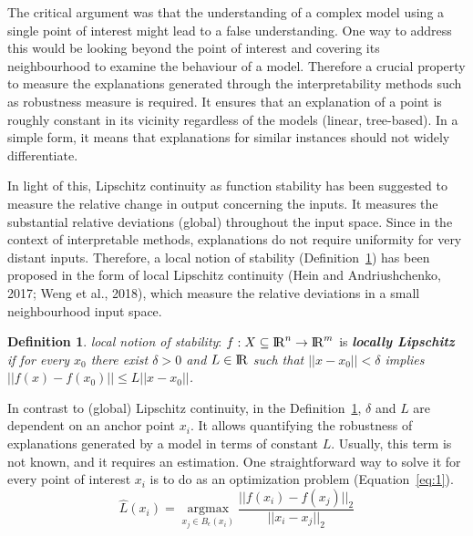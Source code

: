 \documentclass[english]{tktltiki2}
\theoremstyle{definition}
\newtheorem{definition}[thm]{Definition}
\theoremstyle{remark}
\begin{document}
The critical argument was that the understanding of a complex model using a single point of interest might lead to a false understanding. One way to address this would be looking beyond the point of interest and covering its neighbourhood to examine the behaviour of a model. Therefore a crucial property to measure the explanations generated through the interpretability methods such as robustness measure is required. It ensures that an explanation of a point is roughly constant in its vicinity regardless of the models (linear, tree-based).  In a simple form, it means that explanations for similar instances should not widely differentiate.

In light of this, Lipschitz continuity as function stability has been suggested to measure the relative change in output concerning the inputs. It measures the substantial relative deviations (global) throughout the input space. Since in the context of interpretable methods, explanations do not require uniformity for very distant inputs. Therefore, a local notion of stability (Definition~\ref{def:3}) has been proposed in the form of local Lipschitz continuity (Hein and Andriushchenko, 2017; Weng et al., 2018), which measure the relative deviations in a small neighbourhood input space.
\begin{definition}\label{def:3}{\textit{local notion of stability}:}
	$f: X \subseteq {\rm I\!R}^n \rightarrow {\rm I\!R}^m$ is \textbf{\textit{locally Lipschitz}} \textit{if for every $x_0$ there exist $\delta > 0$ and $L \in {\rm I\!R}$ such that $||x - x_0|| < \delta$ implies $||f(x) - f(x_0)|| \leq L||x - x_0||$.}
\end{definition}

In contrast to (global) Lipschitz continuity, in the Definition~\ref{def:3}, $\delta$ and $L$ are dependent on an anchor point $x_i$. It allows quantifying the robustness of explanations generated by a model in terms of constant $L$. Usually, this term is not known, and it requires an estimation. One straightforward way to solve it for every point of interest $x_i$ is to do as an optimization problem (Equation~\ref{eq:1}).
\begin{equation}\label{eq:1}
\hat{L}(x_i) = \operatorname*{argmax}_{x_j \in B_{\epsilon}(x_i)}  \frac{||f(x_i) - f(x_j)||_{2}}{||x_i - x_j||_{2}}
\end{equation}
\end{document}
